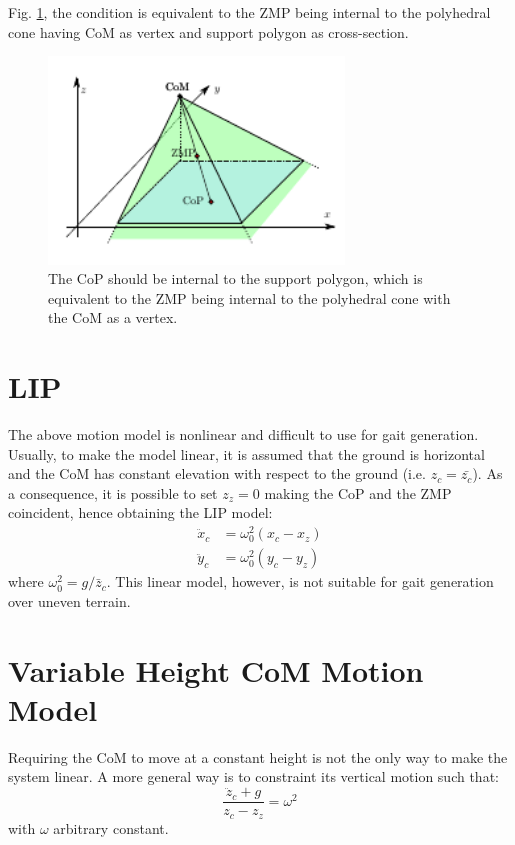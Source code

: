 Fig. \ref{fig:balance3d}, the condition is equivalent to the ZMP being internal
to the polyhedral cone having CoM as vertex and support
polygon as cross-section.
\begin{figure}
    \centering
    \includegraphics[width=0.7\textwidth]{figures/balance3d.pdf}
    \caption{The CoP should be internal to the support polygon, which is 
        equivalent to the ZMP being internal to the polyhedral cone with 
        the CoM as a vertex.}
    \label{fig:balance3d}
\end{figure}

\section{LIP}
The above motion model is nonlinear and difficult to use for gait generation.
Usually, to make the model linear, it is assumed that the ground is horizontal 
and the CoM has constant elevation with respect to the ground (i.e.
$z_c=\bar{z_c}$). As a consequence, it is possible to set $z_z=0$ making the 
CoP and the ZMP coincident, hence obtaining the LIP model:
\begin{align}
  \ddot{x}_c &= \omega_0^2 (x_c - x_z) \label{eq:lipm-x} \\
  \ddot{y}_c &= \omega_0^2 (y_c - y_z) \label{eq:lipm-y}
\end{align}
where $\omega_0^2 = g/\bar{z}_c$. This linear model, however, is not suitable 
for gait generation over uneven terrain.

\section{Variable Height CoM Motion Model}
Requiring the CoM to move at a constant height is not the only way to make the 
system linear. A more general way is to constraint its vertical motion such
that:
\begin{equation}
  \frac{\ddot{z}_c + g}{z_c - z_z} = \omega^2
\end{equation}
with $\omega$ arbitrary constant.

